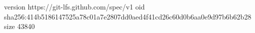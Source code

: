 version https://git-lfs.github.com/spec/v1
oid sha256:414b5186147525a78c01a7e2807dd0aed4f41cd26c60d0b6aa0e9d97b6b62b28
size 43840

